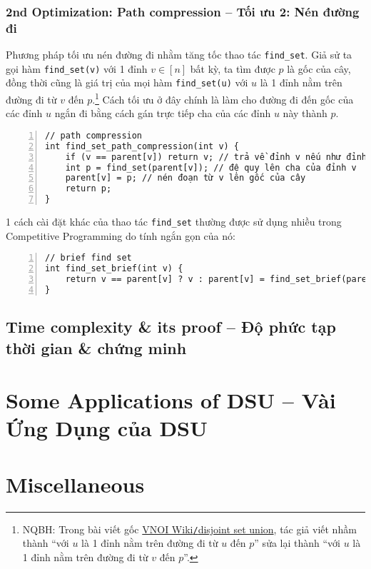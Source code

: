 \documentclass{article}
\begin{document}
\subsubsection{2nd Optimization: Path compression -- Tối ưu 2: Nén đường đi}
Phương pháp tối ưu nén đường đi nhằm tăng tốc thao tác \verb|find_set|. Giả sử ta gọi hàm \verb|find_set(v)| với 1 đỉnh $v\in[n]$ bất kỳ, ta tìm được $p$ là gốc của cây, đồng thời cũng là giá trị của mọi hàm \verb|find_set(u)| với $u$ là 1 đỉnh nằm trên đường đi từ $v$ đến $p$.\footnote{NQBH: Trong bài viết gốc \href{https://wiki.vnoi.info/algo/data-structures/disjoint-set-union}{VNOI Wiki{\tt/}disjoint set union}, tác giả viết nhầm thành ``với $u$ là 1 đỉnh nằm trên đường đi từ $u$ đến $p$'' sửa lại thành ``với $u$ là 1 đỉnh nằm trên đường đi từ $v$ đến $p$''.} Cách tối ưu ở đây chính là làm cho đường đi đến gốc của các đỉnh $u$ ngắn đi bằng cách gán trực tiếp cha của các đỉnh $u$ này thành $p$.
\begin{Verbatim}[numbers=left,xleftmargin=5mm]
// path compression
int find_set_path_compression(int v) {
    if (v == parent[v]) return v; // trả về đỉnh v nếu như đỉnh v là gốc của cây
    int p = find_set(parent[v]); // đệ quy lên cha của đỉnh v
    parent[v] = p; // nén đoạn từ v lên gốc của cây
    return p;
}
\end{Verbatim}
1 cách cài đặt khác của thao tác \verb|find_set| thường được sử dụng nhiều trong Competitive Programming do tính ngắn gọn của nó:
\begin{Verbatim}[numbers=left,xleftmargin=5mm]
// brief find set
int find_set_brief(int v) {
    return v == parent[v] ? v : parent[v] = find_set_brief(parent[v]);
}
\end{Verbatim}


\subsection{Time complexity \& its proof -- Độ phức tạp thời gian \& chứng minh}


\section{Some Applications of DSU -- Vài Ứng Dụng của DSU}


\section{Miscellaneous}


\printbibliography[heading=bibintoc]
\end{document}
